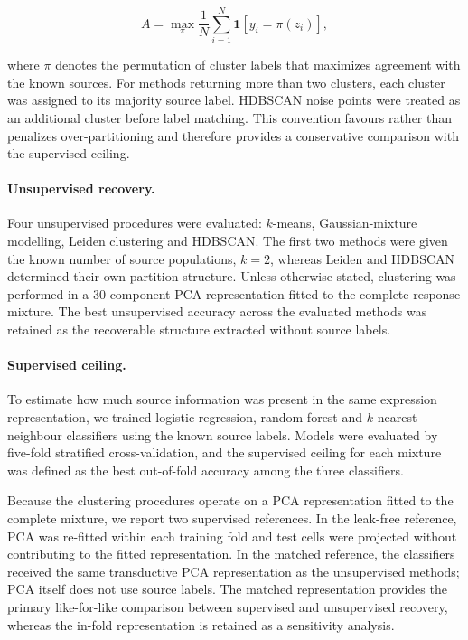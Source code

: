 \documentclass[11pt,letterpaper]{article}
\begin{document}
$$
A
=
\max_{\pi}
\frac{1}{N}
\sum_{i=1}^{N}
\mathbf{1}
\left[
y_i=\pi(z_i)
\right],
$$

where $\pi$ denotes the permutation of cluster labels that maximizes agreement with the known
sources. For methods returning more than two clusters, each cluster was assigned to its majority
source label. HDBSCAN noise points were treated as an additional cluster before label matching.
This convention favours rather than penalizes over-partitioning and therefore provides a
conservative comparison with the supervised ceiling.

\paragraph{Unsupervised recovery.}
Four unsupervised procedures were evaluated: $k$-means, Gaussian-mixture modelling, Leiden
clustering\cite{Leiden} and HDBSCAN\cite{HDBSCAN}. The first two methods were given the known
number of source populations, $k=2$, whereas Leiden and HDBSCAN determined their own partition
structure. Unless otherwise stated, clustering was performed in a 30-component PCA representation
fitted to the complete response mixture. The best unsupervised accuracy across the evaluated
methods was retained as the recoverable structure extracted without source labels.

\paragraph{Supervised ceiling.}
To estimate how much source information was present in the same expression representation, we
trained logistic regression, random forest and $k$-nearest-neighbour classifiers using the known
source labels. Models were evaluated by five-fold stratified cross-validation, and the supervised
ceiling for each mixture was defined as the best out-of-fold accuracy among the three classifiers.

Because the clustering procedures operate on a PCA representation fitted to the complete mixture,
we report two supervised references. In the leak-free reference, PCA was re-fitted within each
training fold and test cells were projected without contributing to the fitted representation. In
the matched reference, the classifiers received the same transductive PCA representation as the
unsupervised methods; PCA itself does not use source labels. The matched representation provides
the primary like-for-like comparison between supervised and unsupervised recovery, whereas the
in-fold representation is retained as a sensitivity analysis.
\end{document}
